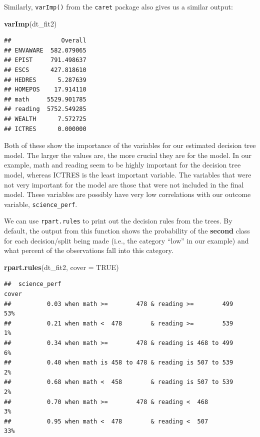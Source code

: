 \documentclass[]{book}
\newenvironment{Shaded}{\begin{snugshade}}{\end{snugshade}}
\newcommand{\DataTypeTok}[1]{\textcolor[rgb]{0.13,0.29,0.53}{#1}}
\newcommand{\KeywordTok}[1]{\textcolor[rgb]{0.13,0.29,0.53}{\textbf{#1}}}
\newcommand{\NormalTok}[1]{#1}
\newcommand{\OtherTok}[1]{\textcolor[rgb]{0.56,0.35,0.01}{#1}}
\begin{document}
Similarly, \texttt{varImp()} from the \texttt{caret} package also gives us a similar output:

\begin{Shaded}
\begin{Highlighting}[]
\KeywordTok{varImp}\NormalTok{(dt_fit2)}
\end{Highlighting}
\end{Shaded}

\begin{verbatim}
##              Overall
## ENVAWARE  582.079065
## EPIST     791.498637
## ESCS      427.818610
## HEDRES      5.287639
## HOMEPOS    17.914110
## math     5529.901785
## reading  5752.549285
## WEALTH      7.572725
## ICTRES      0.000000
\end{verbatim}

Both of these show the importance of the variables for our estimated decision tree model. The larger the values are, the more crucial they are for the model. In our example, math and reading seem to be highly important for the decision tree model, whereas ICTRES is the least important variable. The variables that were not very important for the model are those that were not included in the final model. These variables are possibly have very low correlations with our outcome variable, \texttt{science\_perf}.

We can use \texttt{rpart.rules} to print out the decision rules from the trees. By default, the output from this function shows the probability of the \textbf{second} class for each decision/split being made (i.e., the category ``low'' in our example) and what percent of the observations fall into this category.

\begin{Shaded}
\begin{Highlighting}[]
\KeywordTok{rpart.rules}\NormalTok{(dt_fit2, }\DataTypeTok{cover =} \OtherTok{TRUE}\NormalTok{)}
\end{Highlighting}
\end{Shaded}

\begin{verbatim}
##  science_perf                                                   cover
##          0.03 when math >=        478 & reading >=        499     53%
##          0.21 when math <  478        & reading >=        539      1%
##          0.34 when math >=        478 & reading is 468 to 499      6%
##          0.40 when math is 458 to 478 & reading is 507 to 539      2%
##          0.68 when math <  458        & reading is 507 to 539      2%
##          0.70 when math >=        478 & reading <  468             3%
##          0.95 when math <  478        & reading <  507            33%
\end{verbatim}
\end{document}
